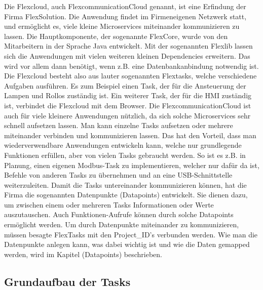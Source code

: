 Die Flexcloud, auch FlexcommunicationCloud genannt, ist eine Erfindung der Firma FlexSolution. Die Anwendung findet im Firmeneigenen Netzwerk statt, und ermöglicht es, viele kleine Microservices miteinander kommunizieren zu lassen. Die Hauptkomponente, der sogenannte FlexCore, wurde von den Mitarbeitern in der Sprache Java entwickelt. Mit der sogenannten Flexlib lassen sich die Anwendungen mit vielen weiteren kleinen Dependencies erweitern. Das wird vor allem dann benötigt, wenn z.B. eine Datenbankanbindung notwendig ist. Die Flexcloud besteht also aus lauter sogenannten Flextasks, welche verschiedene Aufgaben ausführen. Es zum Beispiel einen Task, der für die Ansteuerung der Lampen und Rollos zuständig ist. 
Ein weiterer Task, der für die HMI zuständig ist, verbindet die Flexcloud mit dem Browser. Die FlexcommunicationCloud ist auch für viele kleinere Anwendungen nützlich, da sich solche Microservices sehr schnell aufsetzen lassen. Man kann einzelne Tasks aufsetzen oder mehrere miteinander verbinden und kommunizieren lassen. Das hat den Vorteil, dass man wiederverwendbare Anwendungen entwickeln kann, welche nur grundlegende Funktionen erfüllen, aber von vielen Tasks gebraucht werden. So ist es z.B. in Planung, einen eigenen Modbus-Task zu implementieren, welcher nur dafür da ist, Befehle von anderen Tasks zu übernehmen und an eine USB-Schnittstelle weiterzuleiten. 
Damit die Tasks untereinander kommunizieren können, hat die Firma die sogenannten Datenpunkte (Datapoints) entwickelt. Sie dienen dazu, um zwischen einem oder mehreren Tasks Informationen oder Werte auszutauschen. Auch Funktionen-Aufrufe können durch solche Datapoints ermöglicht werden. Um durch Datenpunkte miteinander zu kommunizieren, müssen besagte FlexTasks mit den Project\_ID's verbunden werden. 
Wie man die Datenpunkte anlegen kann, was dabei wichtig ist und wie die Daten gemapped werden, wird im Kapitel (Datapoints) beschrieben.
\subsection{Grundaufbau der Tasks}

